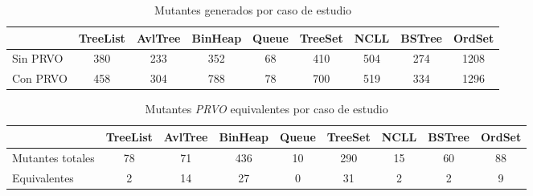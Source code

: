 
\begin{table}[]
	\caption{Mutantes generados por caso de estudio}
	\label{tables.results.mutants}
	\centering
	\footnotesize
	\def\arraystretch{1.1}
	\setlength\tabcolsep{1.0mm}
	\begin{tabular}{l|cccccccc|}
		\cline{2-9}
		& \multicolumn{1}{l}{TreeList} & \multicolumn{1}{l}{AvlTree} & \multicolumn{1}{l}{BinHeap} & \multicolumn{1}{l}{Queue} & \multicolumn{1}{l}{TreeSet} & \multicolumn{1}{l}{NCLL} & \multicolumn{1}{l}{BSTree} & \multicolumn{1}{l|}{OrdSet} \\ \hline
		\multicolumn{1}{|l|}{Sin PRVO} & 380 & 233 & 352 & 68 & 410 & 504 & 274 & 1208\\ \cline{1-1}
		\multicolumn{1}{|l|}{Con PRVO} & 458 & 304 & 788 & 78 & 700 & 519 & 334 & 1296\\ \hline
	\end{tabular}
\end{table}

\begin{table}[]
	\caption{Mutantes \emph{PRVO} equivalentes por caso de estudio}
	\label{tables.results.equivalents}
	\centering
	\footnotesize
	\def\arraystretch{1.1}
	\setlength\tabcolsep{0.5mm}
	\begin{tabular}{l|cccccccc|}
		\cline{2-9}
		& \multicolumn{1}{l}{TreeList} & \multicolumn{1}{l}{AvlTree} & \multicolumn{1}{l}{BinHeap} & \multicolumn{1}{l}{Queue} & \multicolumn{1}{l}{TreeSet} & \multicolumn{1}{l}{NCLL} &
		\multicolumn{1}{l}{BSTree} & \multicolumn{1}{l|}{OrdSet}\\ \hline
		\multicolumn{1}{|l|}{Mutantes totales} & 78 & 71 & 436 & 10 & 290 & 15 & 60 & 88\\ \cline{1-1}
		\multicolumn{1}{|l|}{Equivalentes} & 2 & 14 & 27 & 0 & 31 & 2 & 2 & 9\\ \hline
	\end{tabular}
\end{table}

